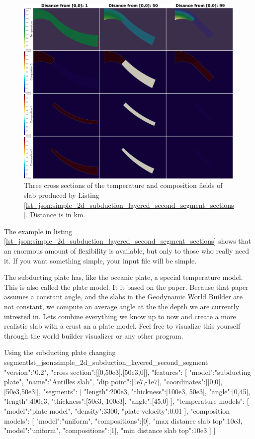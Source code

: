 \documentclass{book}
\newcommand{\GWB}{{Geodynamic World Builder}}
\begin{document}
\begin{figure}
    \centering
    \includegraphics[width=0.99\textwidth]{manual_subduction_section_segments_dist_all_v3_small.png}
    \caption{Three cross sections of the temperature and composition fields of slab produced by Listing \ref{lst_json:simple_2d_subduction_layered_second_segment_sections}. Distance is in km.}
    \label{fig:simple_2d_subduction}
\end{figure}

The example in listing \ref{lst_json:simple_2d_subduction_layered_second_segment_sections} shows that an enormous amount of flexibility is available, but only to those who really need it. If you want something simple, your input file will be simple.

The subducting plate has, like the oceanic plate, a special temperature model. This is also called the plate model. It it based on the \cite{mckenzie1970} paper. Because that paper assumes a constant angle, and the slabs in the \GWB{} are not constant, we compute an average angle at the the depth we are currently intrested in. Lets combine everything we know up to now and create a more realistic slab with a crust an a plate model. Feel free to visualize this yourself through the world builder visualizer or any other program.

\begin{javascriptcode}{Using the subducting plate changing segment}{lst_json:simple_2d_subduction_layered_second_segment}
{
  "version":"0.2",
  "cross section":[[0,50e3],[50e3,0]],
  "features":
  [
     {
       "model":"subducting plate", "name":"Antilles slab", "dip point":[1e7,-1e7],
       "coordinates":[[0,0],[50e3,50e3]], 
     "segments":
     [
         {"length":200e3, "thickness":[100e3, 50e3], "angle":[0,45]},
         {"length":400e3, "thickness":[50e3, 100e3], "angle":[45,0]}
     ],
     "temperature models":
     [
       {"model":"plate model", "density":3300, "plate velocity":0.01}
     ],
     "composition models":
     [
       {"model":"uniform", "compositions":[0], "max distance slab top":10e3},
       {"model":"uniform", "compositions":[1], "min distance slab top":10e3}
     ]
    }
  ]
}
\end{javascriptcode}
\end{document}
